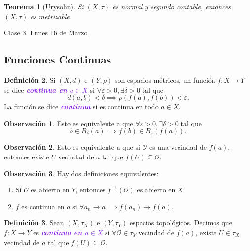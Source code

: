 \documentclass{article}
\newtheorem{theorem}{Teorema}[section]
\theoremstyle{definition}
\newtheorem{definition}[theorem]{Definición}
\newtheorem*{obs}{Observación}
\theoremstyle{remark}
\numberwithin{equation}{section}
\renewcommand{\O}{\mathcal{O}}
\renewcommand{\d}{\delta}
\newcommand{\e}{\varepsilon}
\renewcommand{\t}{\tau}
\newcommand{\wea}[1]{\textcolor{BlueViolet}{\textbf{\emph{#1}}}}
\newcommand{\fecha}[1]{\begin{flushright} \underline{#1} \end{flushright}}
\begin{document}
\begin{theorem}
  [Urysohn]
  Si $(X,\t)$ es normal y segundo contable, entonces $(X,\t)$ es metrizable.
\end{theorem}

\newpage
\fecha{Clase 3. Lunes 16 de Marzo}
\subsection{Funciones Continuas}

\begin{definition}
  Si $(X,d)$ e $(Y,\rho)$ son espacios métricos, un función $f \colon X \to Y$ se dice \wea{continua en $a \in X$} si $\forall \e>0, \exists \d>0$ tal que $$d(a,b) < \d \implies \rho(f(a),f(b)) < \e.$$
  La función se dice \wea{continua} si es continua en todo $a \in X$.
\end{definition}

\begin{obs}
  Esto es equivalente a que $\forall \e>0, \exists \d>0$ tal que $$b \in B_\d(a) \implies f(b) \in B_\e(f(a)).$$
\end{obs}

\begin{obs}
  Esto es equivalente a que si $\O$ es una vecindad de $f(a)$, entonces existe $U$ vecindad de $a$ tal que $f(U) \subseteq \O$.
\end{obs}

\begin{obs}
  Hay dos definiciones equivalentes:
  \begin{enumerate}[(1)]
    \item Si $\O$ es abierto en $Y$, entonces $f^{-1}(\O)$ es abierto en $X$.
    \item $f$ es continua en $a$ si $\forall a_n \to a \implies f(a_n) \to f(a)$.
  \end{enumerate}
\end{obs}

\begin{definition}
  Sean $(X,\t_X)$ e $(Y,\t_Y)$ espacios topológicos. Decimos que $f \colon X \to Y$ es \wea{continua en $a \in X$} si $\forall \O \in \t_Y$ vecindad de $f(a)$, existe $U \in \t_X$ vecindad de $a$ tal que $f(U) \subseteq \O$.
\end{definition}
\end{document}

